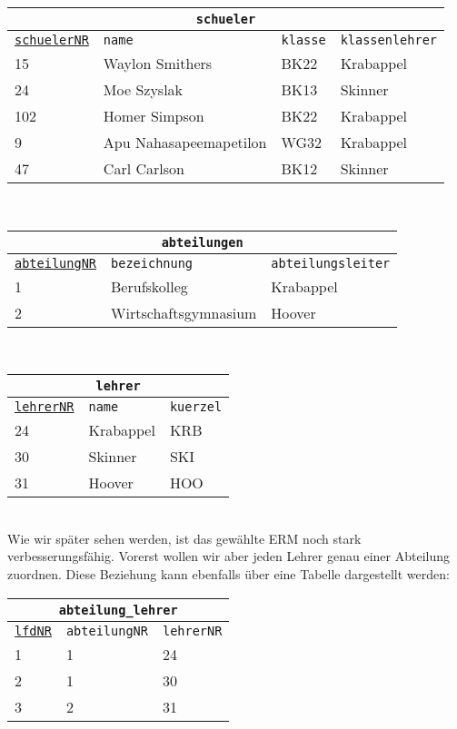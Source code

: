\begin{tabular}{llll}
	\multicolumn{4}{c}{\lstinline!schueler!}\\
	\hline
	\underline{\lstinline!schuelerNR!}&\lstinline!name!&\lstinline!klasse!&\lstinline!klassenlehrer!\\
	\hline
	15&Waylon Smithers&BK22&Krabappel\\
	24&Moe Szyslak&BK13&Skinner\\
	102&Homer Simpson&BK22&Krabappel\\
	9&Apu Nahasapeemapetilon&WG32&Krabappel\\
	47&Carl Carlson&BK12&Skinner\\
\end{tabular}\\
\begin{tabular}{lll}
	\multicolumn{3}{c}{\lstinline!abteilungen!}\\
	\hline
	\underline{\lstinline!abteilungNR!}&\lstinline!bezeichnung!&\lstinline!abteilungsleiter!\\
	\hline
	1&Berufskolleg&Krabappel\\
	2&Wirtschaftsgymnasium&Hoover\\
\end{tabular}\\
\begin{tabular}{lll}
	\multicolumn{3}{c}{\lstinline!lehrer!}\\
	\hline
	\underline{\lstinline!lehrerNR!}&\lstinline!name!&\lstinline!kuerzel!\\
	\hline
	24&Krabappel&KRB\\
	30&Skinner&SKI\\
	31&Hoover&HOO\\
\end{tabular}\\
Wie wir später sehen werden, ist das gewählte ERM noch stark verbesserungsfähig. Vorerst wollen wir aber jeden Lehrer genau einer Abteilung zuordnen. Diese Beziehung kann ebenfalls über eine Tabelle dargestellt werden:

\begin{tabular}{lll}
	\multicolumn{3}{c}{\lstinline!abteilung_lehrer!}\\
	\hline
	\underline{\lstinline!lfdNR!}&\lstinline!abteilungNR!&\lstinline!lehrerNR!\\
	\hline
	1&1&24\\
	2&1&30\\
	3&2&31\\
\end{tabular}

